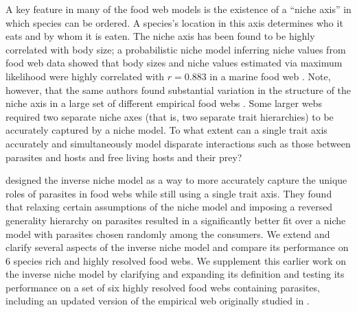 \documentclass[/home/nkappler/Research/Dissertation/
 dissertation.tex]{subfiles}
\begin{document}
\begin{bibunit}
A key feature in many of the food web models is the existence of a ``niche
axis'' in which species can be ordered. A species's location in this axis
determines who it eats and by whom it is eaten. The niche axis has been found to be
highly correlated with body size; a probabilistic niche model inferring niche
values from food web data showed that body sizes and niche values estimated via
maximum likelihood were highly correlated with $r=0.883$ in a marine food web
\cite*{Williams2010}. Note, however, that the same authors found substantial
variation in the structure of the niche axis in a large set of different
empirical food webs \cite*{Williams2011}. Some larger webs required two separate
niche axes (that is, two separate trait hierarchies) to be accurately captured
by a niche model. To what extent can a single trait axis accurately and
simultaneously model disparate interactions such as those between parasites and
hosts and free living hosts and their prey?

\cite*{Warren2010} designed the inverse niche model as a way to more accurately
capture the unique roles of parasites in food webs while still using a single
trait axis. They found that relaxing certain assumptions of the niche model and
imposing a reversed generality hierarchy on parasites resulted in a
significantly better fit over a niche model with parasites chosen randomly
among the consumers. We extend and clarify several aspects of the inverse niche
model and compare its performance on 6 species rich and highly resolved food
webs. We supplement this earlier work on the inverse niche model by clarifying
and expanding its definition and testing its performance on a set of six highly
resolved food webs containing parasites, including an updated version of the
empirical web originally studied in \cite*{Warren2010}.


\end{bibunit}
\end{document}

